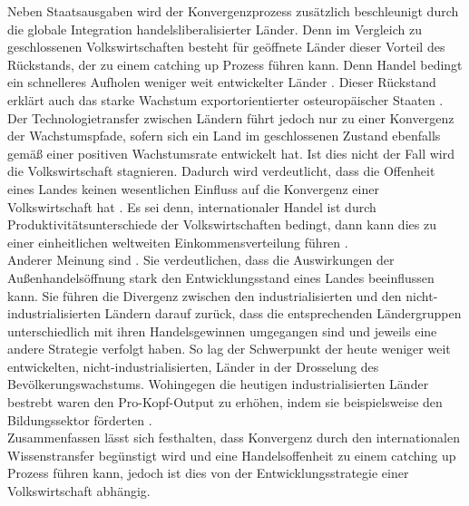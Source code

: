 %
Neben Staatsausgaben wird der Konvergenzprozess zusätzlich beschleunigt durch die globale Integration handelsliberalisierter Länder. Denn im Vergleich zu geschlossenen Volkswirtschaften  besteht für geöffnete Länder dieser Vorteil des Rückstands, der zu einem catching up Prozess führen kann. Denn Handel bedingt ein schnelleres Aufholen weniger weit entwickelter Länder \cite{Sachs.1995}. Dieser Rückstand erklärt auch das starke Wachstum exportorientierter osteuropäischer Staaten \cite{Ventura.1997}.\\
%
Der Technologietransfer zwischen Ländern führt jedoch nur zu einer Konvergenz der Wachstumspfade, sofern sich ein Land im geschlossenen Zustand ebenfalls gemäß einer positiven Wachstumsrate entwickelt hat. Ist dies nicht der Fall wird die Volkswirtschaft stagnieren. Dadurch wird verdeutlicht, dass die Offenheit eines Landes keinen wesentlichen Einfluss auf die Konvergenz einer Volkswirtschaft hat \cite{Howitt.2000}. 
Es sei denn, internationaler Handel ist durch Produktivitätsunterschiede der Volkswirtschaften bedingt, dann kann dies zu einer einheitlichen weltweiten Einkommensverteilung führen \cite{Howitt.2000,Acemoglu.2002,Eaton.2001}.\\
%
Anderer Meinung sind \cite{Galor.2006,Galor.2008}. Sie verdeutlichen, dass die Auswirkungen der Außenhandelsöffnung stark den Entwicklungsstand eines Landes beeinflussen kann. Sie führen die Divergenz zwischen den industrialisierten und den nicht-industrialisierten Ländern darauf zurück, dass die entsprechenden Ländergruppen unterschiedlich mit ihren Handelsgewinnen umgegangen sind und jeweils eine andere Strategie verfolgt haben. So lag der Schwerpunkt der heute weniger weit entwickelten, nicht-industrialisierten, Länder in der Drosselung des Bevölkerungswachstums. Wohingegen die heutigen industrialisierten Länder bestrebt waren den Pro-Kopf-Output zu erhöhen, indem sie beispielsweise den Bildungssektor förderten \cite{Galor.2006}.\\
%
Zusammenfassen lässt sich festhalten, dass Konvergenz durch den internationalen Wissenstransfer begünstigt wird und eine Handelsoffenheit zu einem catching up Prozess führen kann, jedoch ist dies von der Entwicklungsstrategie einer Volkswirtschaft abhängig.